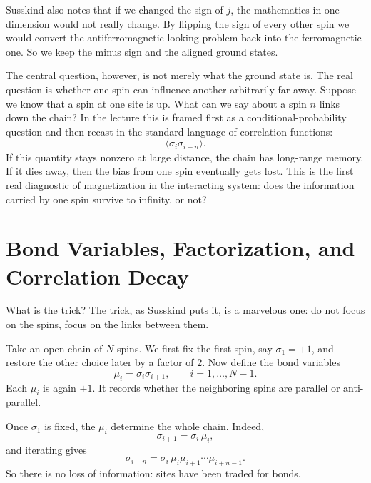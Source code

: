 Susskind also notes that if we changed the sign of \(j\), the mathematics in one dimension would not really change. By flipping the sign of every other spin we would convert the antiferromagnetic-looking problem back into the ferromagnetic one. So we keep the minus sign and the aligned ground states.

The central question, however, is not merely what the ground state is. The real question is whether one spin can influence another arbitrarily far away. Suppose we know that a spin at one site is up. What can we say about a spin \(n\) links down the chain? In the lecture this is framed first as a conditional-probability question and then recast in the standard language of correlation functions:
\begin{equation}
\langle \sigma_i \sigma_{i+n}\rangle.
\end{equation}
If this quantity stays nonzero at large distance, the chain has long-range memory. If it dies away, then the bias from one spin eventually gets lost. This is the first real diagnostic of magnetization in the interacting system: does the information carried by one spin survive to infinity, or not?

\section{Bond Variables, Factorization, and Correlation Decay}

What is the trick? The trick, as Susskind puts it, is a marvelous one: do not focus on the spins, focus on the links between them.

Take an open chain of \(N\) spins. We first fix the first spin, say \(\sigma_1=+1\), and restore the other choice later by a factor of \(2\). Now define the bond variables
\begin{equation}
\mu_i=\sigma_i\sigma_{i+1}, \qquad i=1,\dots,N-1.
\end{equation}
Each \(\mu_i\) is again \(\pm1\). It records whether the neighboring spins are parallel or anti-parallel.

Once \(\sigma_1\) is fixed, the \(\mu_i\) determine the whole chain. Indeed,
\begin{equation}
\sigma_{i+1}=\sigma_i\,\mu_i,
\end{equation}
and iterating gives
\begin{equation}
\sigma_{i+n}=\sigma_i\,\mu_i\mu_{i+1}\cdots\mu_{i+n-1}.
\end{equation}
So there is no loss of information: sites have been traded for bonds.


